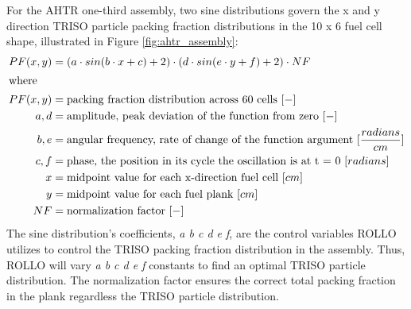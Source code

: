 For the \gls{AHTR} one-third assembly, two sine distributions govern the x and y direction
\gls{TRISO} particle packing fraction distributions in the 10 x 6 fuel cell shape, illustrated in 
Figure \ref{fig:ahtr_assembly}:
\begin{align}
    PF(x, y) &= \left(a\cdot sin(b\cdot x + c) + 2\right) 
    \cdot \left(d\cdot sin(e\cdot y + f) + 2\right) \cdot NF \\
    \intertext{where}
    PF(x, y) &= \mbox{packing fraction distribution across 60 cells } [-] \nonumber \\ 
    a, d &= \mbox{amplitude, peak deviation of the function from zero } [-] \nonumber \\
    b, e &= \mbox{angular frequency, rate of change of the function argument } [\frac{radians}{cm}] \nonumber \\
    c, f &= \mbox{phase, the position in its cycle the oscillation is at t = 0 } [radians]\nonumber \\
    x &= \mbox{midpoint value for each x-direction fuel cell } [cm]\nonumber \\
    y &= \mbox{midpoint value for each fuel plank } [cm]\nonumber \\
    NF &= \mbox{normalization factor } [-]\nonumber
\end{align}
The sine distribution's coefficients, \textit{a b c d e f}, are the control variables \gls{ROLLO} 
utilizes to control the TRISO packing fraction distribution in the assembly.
Thus, \gls{ROLLO} will vary \textit{a b c d e f} constants to find an optimal TRISO particle 
distribution. 
The normalization factor ensures the correct total packing fraction 
in the plank regardless the \gls{TRISO} particle distribution.

